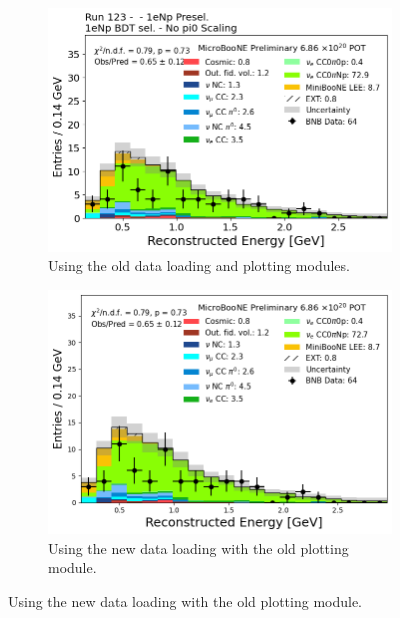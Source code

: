 \begin{figure}[H]
 \centering
    \begin{subfigure}[t]{0.32\linewidth}
        \includegraphics[width=\linewidth]{technote/EventSelections/Figures/Run123_1eNp_RecoEnergy_Old.png}
        \caption{Using the old data loading and plotting modules.}
    \end{subfigure}%
    \hspace{0.3cm}%
    \begin{subfigure}[t]{0.32\linewidth}
        \includegraphics[width=\linewidth]{technote/EventSelections/Figures/Run123_1eNp_RecoEnergy_Chris.png}%
        \caption{Using the new data loading with the old plotting module.}
    \end{subfigure}%
    \hspace{0.3cm}%

\end{figure}
